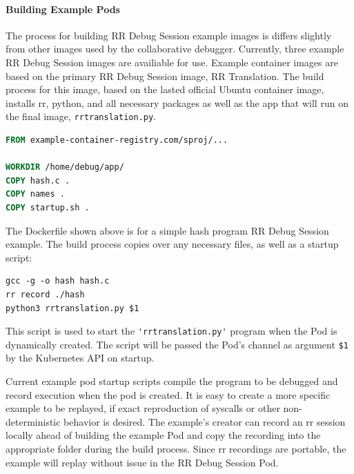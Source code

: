 \documentclass[12pt]{article}
\begin{document}
\paragraph{Building Example Pods}

The process for building RR Debug Session example images is differs
slightly from other images used by the collaborative debugger.
Currently, three example RR Debug Session images are availiable for
use.  Example container images are based on the primary RR Debug
Session image, RR Translation.  The build process for this image,
based on the lasted official Ubuntu container image, installs rr,
python, and all necessary packages as well as the app that will run on
the final image, \lstinline{rrtranslation.py}.\\

\begin{lstlisting}[language=Dockerfile,caption={RR Debug Session Hash Example---Dockerfile},captionpos=b]
FROM example-container-registry.com/sproj/...
  
WORKDIR /home/debug/app/
COPY hash.c .
COPY names .
COPY startup.sh .
\end{lstlisting}

The Dockerfile shown above is for a simple hash program RR Debug
Session example.  The build process copies over any necessary files,
as well as a startup script:\\

\begin{lstlisting}[basicstyle=\linespread{0.5}\ttfamily,caption={Example Startup Script},captionpos=b]
gcc -g -o hash hash.c
rr record ./hash
python3 rrtranslation.py $1
\end{lstlisting}

This script is used to start the \lstinline{'rrtranslation.py'} program
when the Pod is dynamically created.  The script will be passed the
Pod's channel as argument \lstinline{$1} by the Kubernetes API on
startup.
\par

Current example pod startup scripts compile the program to be debugged
and record execution when the pod is created.  It is easy to create a
more specific example to be replayed, if exact reproduction of
syscalls or other non-deterministic behavior is desired.  The
example's creator can record an rr session locally ahead of building
the example Pod and copy the recording into the appropriate folder
during the build process.  Since rr recordings are portable, the
example will replay without issue in the RR Debug Session Pod.
\end{document}
